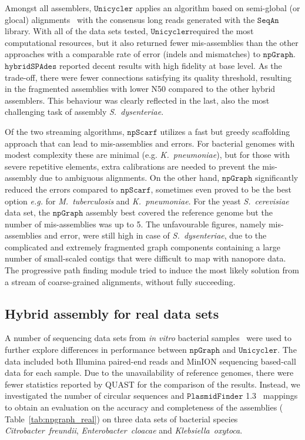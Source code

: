 \documentclass[10pt,letterpaper]{article}
\newcommand{\npscarf}{$\mathtt{npScarf}$}
\newcommand{\npgraph}{$\mathtt{npGraph}$}
\newcommand{\unicycler}{$\mathtt{Unicycler}$}
\newcommand{\minimap}{$\mathtt{minimap2}$}
\newcommand{\kp}{\emph{K.~pneumoniae}}
\newcommand{\EG}{\emph{e.g.}}
\begin{document}
Amongst all assemblers, \unicycler{} applies an algorithm based on semi-global (or glocal) alignments~\cite{Brudno2003glocal} with the consensus long reads generated with the $\mathtt{SeqAn}$ library. With all of the data sets tested, \unicycler required the most computational resources, but it also returned  fewer mis-assemblies than the other approaches with a comparable rate of error (indels and mismatches) to \npgraph{}.
$\mathtt{hybridSPAdes}$ reported decent results with high fidelity at base level. As the trade-off, there were fewer connections satisfying its quality threshold, resulting in the fragmented assemblies with lower N50 compared to the other hybrid assemblers. This behaviour was clearly reflected in the last, also the most challenging task of assembly \emph{S.~dysenteriae}.

Of the two streaming algorithms, \npscarf{} utilizes a fast but greedy scaffolding approach that can lead to mis-assemblies and errors.
For bacterial genomes with modest complexity these are minimal (e.g. \kp), but for those with severe repetitive elements, extra calibrations are needed to prevent the mis-assembly due to ambiguous alignments.
On the other hand, \npgraph{} significantly reduced the errors compared to \npscarf{}, sometimes even proved to be the best option \EG{} for \emph{M.~tuberculosis} and \kp{}.  
For the yeast \emph{S.~cerevisiae} data set, the \npgraph{} assembly best covered the reference genome but the number of mis-assemblies was up to 5.
The unfavourable figures, namely mis-assemblies and error, were still high in case of \emph{S.~dysenteriae}, 
 due to the complicated and extremely fragmented graph components containing a large number of small-scaled contigs that were difficult to map with nanopore data. The progressive path finding module tried to induce the most likely solution from a stream of coarse-grained alignments, without fully succeeding. 

\subsection*{Hybrid assembly for real data sets}
A number of sequencing data sets from \emph{in vitro} bacterial samples~\cite{George2017M14} were used to further explore differences in performance between \npgraph{} and \unicycler{}.
The data included both Illumina paired-end reads and MinION sequencing based-call data for each sample.
Due to the unavailability of reference genomes, there were fewer statistics reported by QUAST for the comparison of the results. 
Instead, we investigated the number of circular sequences and $\mathtt{PlasmidFinder}$ 1.3~\cite{Carattoli2014} mappings to obtain an evaluation on the accuracy and completeness of the assemblies (
Table~\ref{tab:npgraph_real}) 
on three data sets of bacterial species \emph{Citrobacter~freundii}, \emph{Enterobacter~cloacae} and \emph{Klebsiella~oxytoca}. 
\end{document}

